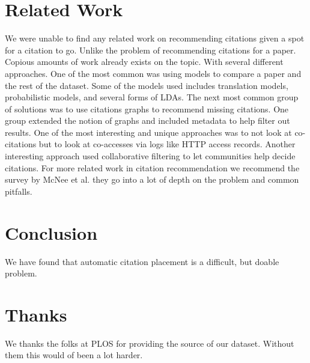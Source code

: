 \documentclass[10pt, conference, compsocconf]{IEEEtran}
\begin{document}
\section{Related Work}\label{sec:related}
We were unable to find any related work on recommending citations given a spot for a citation to go. Unlike the problem of recommending citations for a paper. Copious amounts of work already exists on the topic. With several different approaches. One of the most common was using models to compare a paper and the rest of the dataset. Some of the models used includes translation models, probabilistic models, and several forms of LDAs.\cite{cite1, cite2, cite3} The next most common group of solutions was to use citations graphs to recommend missing citations.\cite{cite6} One group extended the notion of graphs and included metadata to help filter out results.\cite{cite4} One of the most 
interesting and unique approaches was to not look at co-citations but to look at co-accesses via logs like HTTP access records.\cite{cite7}
Another interesting approach used collaborative filtering to let communities help decide citations.\cite{cite8} For more related work in
citation recommendation we recommend the survey by McNee et al. they go into a lot of depth on the problem and common pitfalls.\cite{cite5}

\section{Conclusion}\label{sec:conclusion}
We have found that automatic citation placement is a difficult, but doable problem.

\section{Thanks}
We thanks the folks at PLOS for providing the source of our dataset. Without them this would of been a lot harder.



\end{document}
